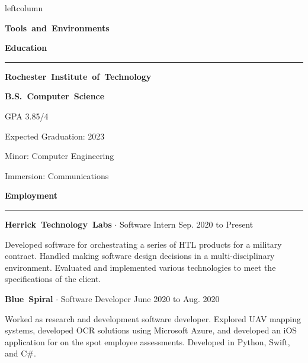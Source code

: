 \documentclass{article}
\newcommand{\rSection}[1] {
  \textcolor{header-blue} {
    \textbf{{\fontsize{0.5cm}{0.45cm}\selectfont \hbox{#1}}} \\
    \rule{0.30\textwidth}{0.1cm}
  }
}
\newcommand{\rSubSection}[1] {
  \textbf{{\fontsize{0.4cm}{0.45cm}\selectfont \hbox{#1}}}
}
\newcommand{\rSubSubSection}[1] {
  \textbf{{\fontsize{0.35cm}{0.45cm}\selectfont \hbox{#1}}}
}
\newcommand\level[2]{%
  \tikz{%
    \ifx#20
    \else
      \foreach \i in {1,...,#2} {
        \filldraw[black!20] (\i ex,0) circle (0.4ex);
      };
    \fi
    \ifx#10
    \else
      \foreach \i in {1,...,#1} {
        \filldraw[black] (\i ex,0) circle (0.4ex);
      };
    \fi
  }
}
\begin{document}
\begin{dynamiccontents*}{leftcolumn}
  \rSubSection{Tools and Environments} \par \bigskip


\end{dynamiccontents*}

\rSection{Education} \par \bigskip
\rSubSubSection{Rochester Institute of Technology} \par
\rSubSubSection{B.S. Computer Science} \par
GPA 3.85/4 \par
Expected Graduation: 2023 \par
Minor: Computer Engineering \par
Immersion: Communications \par \bigskip


\rSection{Employment} \par

\rSubSection{Herrick Technology Labs} $ \cdot $ Software Intern \hfill Sep. 2020 to Present \par
Developed software for orchestrating a series of HTL products for a military contract. Handled making
software design decisions in a multi-disciplinary environment. Evaluated and implemented various technologies
to meet the specifications of the client. \par \bigskip

\rSubSubSection{Blue Spiral} $ \cdot $ Software Developer \hfill June 2020 to Aug. 2020 \par
Worked as research and development software developer. Explored UAV mapping systems, developed OCR solutions
using Microsoft Azure, and developed an iOS application for on the spot employee assessments. Developed in
Python, Swift, and C\#. \par \bigskip
\end{document}
